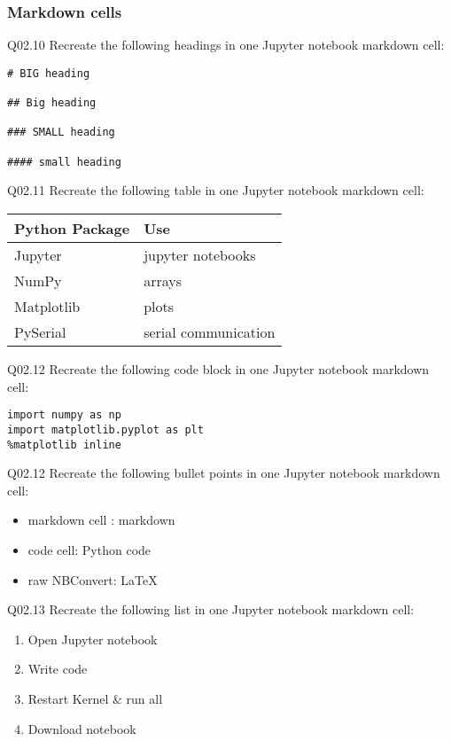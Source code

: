 \documentclass{book}
\newenvironment{problems}{}{}  %
\providecommand{\tightlist}{%
      \setlength{\itemsep}{0pt}\setlength{\parskip}{0pt}}
\begin{document}
    




    
        \begin{problems}
        \hypertarget{markdown-cells}{%
\subsubsection{Markdown cells}\label{markdown-cells}}

Q02.10 Recreate the following headings in one Jupyter notebook markdown
cell:

\begin{lstlisting}
# BIG heading

## Big heading

### SMALL heading

#### small heading
\end{lstlisting}

Q02.11 Recreate the following table in one Jupyter notebook markdown
cell:

\begin{longtable}[]{@{}ll@{}}
\toprule
Python Package & Use\tabularnewline
\midrule
\endhead
Jupyter & jupyter notebooks\tabularnewline
NumPy & arrays\tabularnewline
Matplotlib & plots\tabularnewline
PySerial & serial communication\tabularnewline
\bottomrule
\end{longtable}

Q02.12 Recreate the following code block in one Jupyter notebook
markdown cell:

\begin{lstlisting}
import numpy as np
import matplotlib.pyplot as plt
%matplotlib inline
\end{lstlisting}

Q02.12 Recreate the following bullet points in one Jupyter notebook
markdown cell:

\begin{itemize}
\tightlist
\item
  markdown cell : markdown
\item
  code cell: Python code
\item
  raw NBConvert: LaTeX
\end{itemize}

Q02.13 Recreate the following list in one Jupyter notebook markdown
cell:

\begin{enumerate}
\def\labelenumi{\arabic{enumi}.}
\tightlist
\item
  Open Jupyter notebook
\item
  Write code
\item
  Restart Kernel \& run all
\item
  Download notebook
\end{enumerate}


\end{problems}
\end{document}
